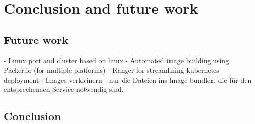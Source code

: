 \chapter{Conclusion and future work} %

\label{chap:conclusion} %




\section{Future work}
- Linux  port and cluster based on linux
- Automated image building using Packer.io (for multiple platforms)
- Ranger for streamlining kubernetes deployment
- Images verkleinern - nur die Dateien ins Image bundlen, die für den entsprechenden Service notwendig sind.




\section{Conclusion}